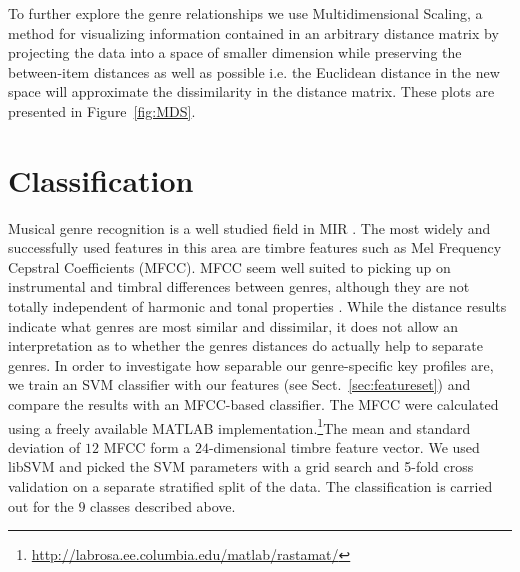 \documentclass{article}
\begin{document}
To further explore the genre relationships we use Multidimensional Scaling, a method for visualizing information contained in an arbitrary distance matrix  by projecting  the data  into a  space of  smaller  dimension while preserving the between-item distances as well as possible i.e. the Euclidean distance in the new space will approximate the dissimilarity in the distance matrix. These plots are presented in Figure~\ref{fig:MDS}. 





\section{Classification}\label{sec:classification}
Musical genre recognition is a well studied field in MIR \cite{fu_survey_2011}. The most widely and successfully used features in this area are timbre features such as Mel Frequency Cepstral Coefficients (MFCC). MFCC seem well suited to picking up on instrumental and timbral differences between genres, although they are not totally independent of harmonic and tonal properties \cite{li_genre_2011}.
While the distance results indicate what genres are most similar and dissimilar, it does not allow an interpretation as to whether the genres distances do actually help to separate genres. In order to investigate how separable  our genre-specific key profiles are, we train an SVM classifier with our features (see Sect.~\ref{sec:featureset}) and compare the results with an MFCC-based classifier. The MFCC were calculated using a freely available MATLAB implementation.\footnote{\url{http://labrosa.ee.columbia.edu/matlab/rastamat/}}The mean and standard deviation of $12$ MFCC form a $24$-dimensional timbre feature vector. We used libSVM  \cite{chang_libsvm:_2011} and picked the SVM parameters with a grid search and 5-fold cross validation on a separate stratified split of the data. The classification is carried out for the $9$ classes described above.
\end{document}
